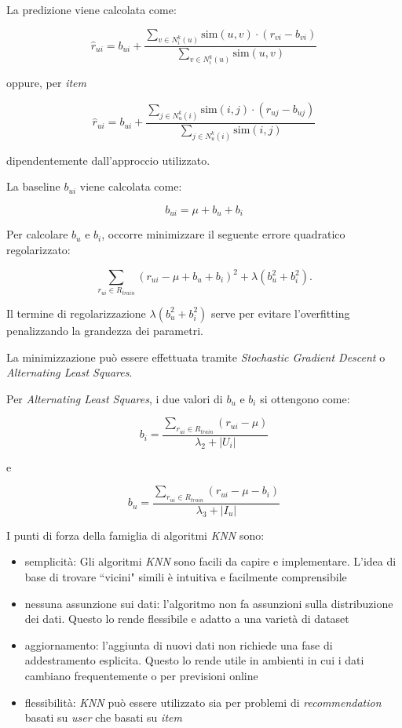La predizione viene calcolata come:

\[
\hat{r}_{ui} = b_{ui} + \frac{\sum\limits_{v \in N^k_i(u)} \text{sim}(u, v) \cdot (r_{vi} - b_{vi})}{\sum\limits_{v \in N^k_i(u)} \text{sim}(u, v)}
\]

oppure, per \textit{item}

\[
\hat{r}_{ui} = b_{ui} + \frac{\sum\limits_{j \in N^k_u(i)} \text{sim}(i, j) \cdot (r_{uj} - b_{uj})}{\sum\limits_{j \in N^k_u(i)} \text{sim}(i, j)}
\]

dipendentemente dall'approccio utilizzato.

La baseline $b_{ui}$ viene calcolata come:

\[
b_{ui} = \mu + b_u + b_i
\]

Per calcolare $b_u$ e $b_i$, occorre minimizzare il seguente errore quadratico regolarizzato:

\[
\sum\limits_{r_{ui} \in R_{train}} \left(r_{ui} - \mu + b_u + b_i\right)^2 + \lambda \left(b_u^2 + b_i^2 \right).
\]

Il termine di regolarizzazione $\lambda \left(b_u^2 + b_i^2 \right)$ serve per evitare l'overfitting penalizzando la grandezza dei parametri.

La minimizzazione può essere effettuata tramite \textit{Stochastic Gradient Descent} o \textit{Alternating Least Squares}.

Per \textit{Alternating Least Squares}, i due valori di $b_u$ e $b_i$ si ottengono come:

\[
b_i = \frac{\sum\limits_{r_{ui} \in R_{train}} (r_{ui} - \mu)}{\lambda_2 + |U_i|}
\]

e

\[
b_u = \frac{\sum\limits_{r_{ui} \in R_{train}} (r_{ui} - \mu - b_i)}{\lambda_3 + |I_u|}
\]

I punti di forza della famiglia di algoritmi \textit{KNN} sono:
\begin{itemize}
    \item semplicità: Gli algoritmi \textit{KNN} sono facili da capire e implementare. L'idea di base di trovare ``vicini" simili è intuitiva e facilmente comprensibile
    \item nessuna assunzione sui dati: l'algoritmo non fa assunzioni sulla distribuzione dei dati. Questo lo rende flessibile e adatto a una varietà di dataset
    \item aggiornamento: l'aggiunta di nuovi dati non richiede una fase di addestramento esplicita. Questo lo rende utile in ambienti in cui i dati cambiano frequentemente o per previsioni online
    \item flessibilità: \textit{KNN} può essere utilizzato sia per problemi di \textit{recommendation} basati su \textit{user} che basati su \textit{item}
\end{itemize}


